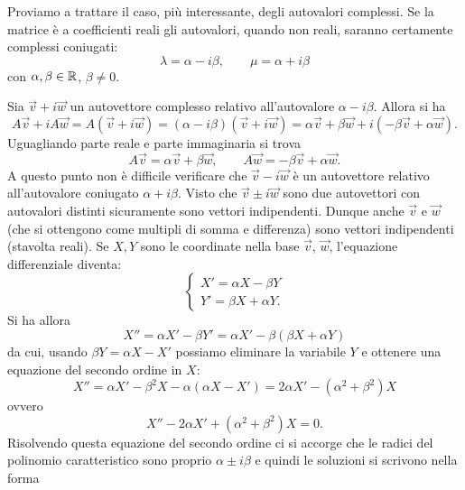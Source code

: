 Proviamo a trattare il caso, più interessante,
degli autovalori complessi. Se la matrice è a coefficienti
reali gli autovalori, quando
non reali, saranno certamente complessi coniugati:
\[
  \lambda = \alpha - i \beta,
  \qquad
  \mu = \alpha + i \beta
\]
con $\alpha,\beta\in {\mathbb R}$, $\beta\neq 0$.

Sia $\vec v + i \vec w$ un autovettore complesso relativo
all'autovalore $\alpha - i \beta$.
Allora si ha
\[
 A\vec v + i A \vec w
 = A(\vec v + i \vec w)
 = (\alpha - i \beta)(\vec v + i \vec w)
 = \alpha \vec v + \beta \vec w +i(-\beta \vec v + \alpha \vec w).
\]
Uguagliando parte reale e parte immaginaria si trova
\[
  A \vec v = \alpha \vec v + \beta \vec w,
  \qquad
  A \vec w = -\beta \vec v + \alpha \vec w.
\]
A questo punto non è difficile verificare che $\vec v - i \vec w$
è un autovettore relativo all'autovalore coniugato $\alpha + i\beta$.
Visto che $\vec v\pm i\vec w$ sono due autovettori con autovalori
distinti sicuramente sono vettori indipendenti.
Dunque anche $\vec v$ e $\vec w$
(che si ottengono come multipli di somma e differenza)
sono vettori indipendenti
(stavolta reali).
Se $X,Y$ sono le coordinate nella base $\vec v$, $\vec w$, l'equazione
differenziale diventa:
\[
\begin{cases}
 X' = \alpha X - \beta Y \\
 Y' = \beta X + \alpha Y.
\end{cases}
\]
Si ha allora%
\[
 X'' = \alpha X' - \beta Y'
 = \alpha X' - \beta (\beta X + \alpha Y)
\]
da cui, usando $\beta Y = \alpha X - X'$ possiamo eliminare la variabile $Y$
e ottenere una equazione del secondo ordine in $X$:
\[
 X'' = \alpha X' - \beta^2 X - \alpha (\alpha X - X')
  = 2 \alpha X' - (\alpha^2+\beta^2) X
\]
ovvero
\[
 X'' - 2 \alpha X' + (\alpha^2 + \beta^2) X = 0.
\]
Risolvendo questa equazione del secondo ordine ci si accorge
che le radici del polinomio caratteristico sono proprio $\alpha \pm i \beta$
e quindi le soluzioni si scrivono nella forma
